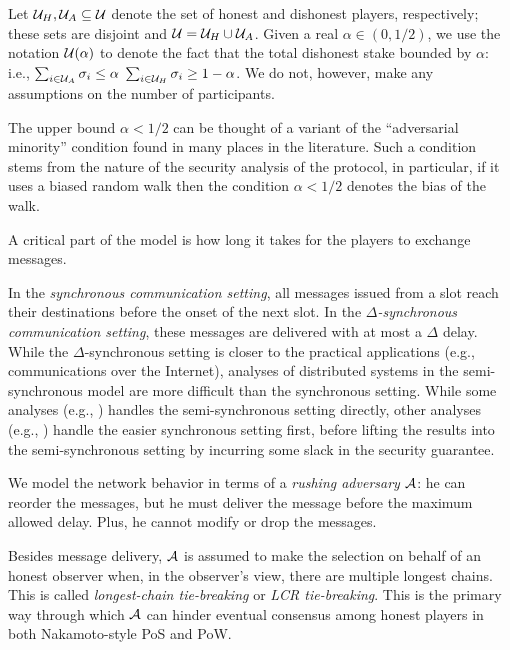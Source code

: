 Let $\mathcal{U}_H, \mathcal{U}_A \subseteq \mathcal{U}$ 
denote the set of honest and dishonest players, respectively;
these sets are disjoint and $\mathcal{U} = \mathcal{U}_H \cup \mathcal{U}_A$.
Given a real $\alpha \in (0,1/2)$, 
we use the notation $\mathcal{U}(\alpha)$ 
to denote the fact that the total dishonest stake bounded by $\alpha$: i.e., 
$\sum_{i \in \mathcal{U}_A} \sigma_i \leq \alpha$
$\sum_{i \in \mathcal{U}_H} \sigma_i \geq 1 - \alpha$. 
We do not, however, make any assumptions on the number of participants.

The upper bound $\alpha < 1/2$ can be thought of a variant of the ``adversarial minority'' condition 
found in many places in the literature. 
Such a condition stems from the nature of the security analysis of the protocol, 
in particular, if it uses a biased random walk then the condition $\alpha < 1/2$ denotes the bias of the walk.


A critical part of the model is how long it takes for the players to exchange messages. 



In the \emph{synchronous communication setting}, 
all messages issued from a slot reach their destinations 
before the onset of the next slot.
In the \emph{$\Delta$-synchronous communication setting}, 
these messages are delivered with at most a $\Delta$ delay. 
While the $\Delta$-synchronous setting is closer to the practical applications 
(e.g., communications over the Internet), 
analyses of distributed systems in the semi-synchronous model 
are more difficult than the synchronous setting. 
While some analyses (e.g., \cite {SnowWhite,Sleepy,PSS}) 
handles the semi-synchronous setting directly,
other analyses (e.g., \cite{Praos}) handle the easier synchronous setting first, 
before lifting the results into the semi-synchronous setting 
by incurring some slack in the security guarantee. 


\label{sec:static-dynamic-adversary}
We model the network behavior in terms of 
a \emph{rushing adversary} $\mathcal{A}$: 
he can reorder the messages, but he must deliver the message before the maximum allowed delay. 
Plus, he cannot modify or drop the messages.

Besides message delivery, 
$\mathcal{A}$ is assumed to make the selection 
on behalf of an honest observer 
when, in the observer's view, there are multiple longest chains. 
This is called \emph{longest-chain tie-breaking} or \emph{LCR tie-breaking}. 
This is the primary way through which $\mathcal{A}$ can hinder eventual consensus among honest players 
in both Nakamoto-style PoS and PoW.



